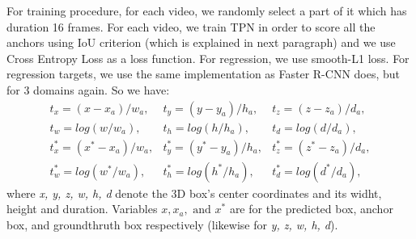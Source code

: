 \documentclass{report}
\begin{document}
For training procedure, for each video, we randomly select a part of it which has duration 16 frames. For each video, we train TPN in
order to score all the anchors using IoU criterion (which is explained in next paragraph) and we use Cross Entropy Loss as a loss function.
For regression, we use smooth-L1 loss. For regression targets, we use the same implementation as Faster R-CNN does, but for 3 domains again.
So we have:
\[ \begin{matrix}
    t_x = (x-x_a)/w_a, & t_y = (y-y_a)/h_a, & t_z= (z-z_a)/d_a, \\
    t_w= log(w/w_a), & t_h= log(h/h_a), & t_d = log(d/d_a), \\
    t^*_x = (x^* - x_a)/w_a, & t^*_y = (y^* - y_a)/h_a, & t^*_z = (z^* - z_a)/d_a, \\
    t^*_w = log(w^* /w_a), & t^*_h = log(h^*/h_a), & t^*_d = log(d^*/d_a),
  \end{matrix}
\]
where \textit{x, y, z, w, h, d} denote the 3D box's center coordinates and its widht, height and duration. Variables $x, x_a, \text{ and } x^*$
are for the predicted box, anchor box, and groundthruth box respectively (likewise for \textit{y, z, w, h, d}). \par
\end{document}
